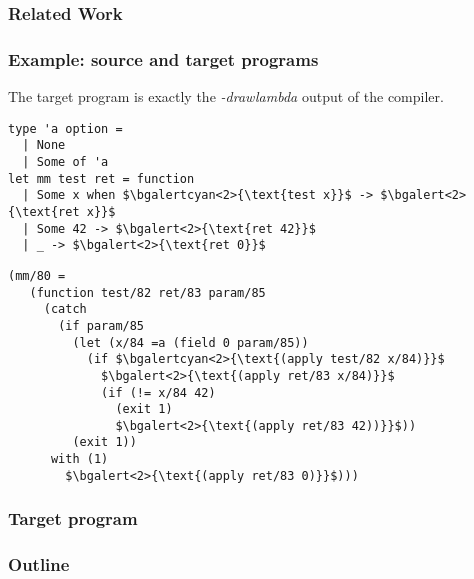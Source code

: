 \documentclass{beamer}
\begin{document}
\begin{frame}
  \frametitle{Related Work}
\end{frame}

\begin{frame}[fragile]
  \frametitle{Example: source and target programs}
The target program is exactly the \emph{-drawlambda} output of the compiler.

\begin{small}
\hspace{-1em}
\begin{minipage}{0.36\linewidth}
  \begin{lstlisting}
type 'a option =
  | None
  | Some of 'a
let mm test ret = function
  | Some x when $\bgalertcyan<2>{\text{test x}}$ -> $\bgalert<2>{\text{ret x}}$
  | Some 42 -> $\bgalert<2>{\text{ret 42}}$
  | _ -> $\bgalert<2>{\text{ret 0}}$
\end{lstlisting}
\end{minipage}
\hfill
\begin{minipage}{0.64\linewidth}
\begin{lstlisting}
(mm/80 =
   (function test/82 ret/83 param/85
     (catch
       (if param/85
         (let (x/84 =a (field 0 param/85))
           (if $\bgalertcyan<2>{\text{(apply test/82 x/84)}}$
             $\bgalert<2>{\text{(apply ret/83 x/84)}}$
             (if (!= x/84 42)
               (exit 1)
               $\bgalert<2>{\text{(apply ret/83 42))}}$))
         (exit 1))
      with (1)
        $\bgalert<2>{\text{(apply ret/83 0)}}$)))
\end{lstlisting}
\end{minipage}
\end{small}
\pause
\end{frame}

\begin{frame}[fragile]
  \frametitle{Target program}
\end{frame}

\begin{frame}
  \frametitle{Outline}
  \tableofcontents
\end{frame}
\end{document}
